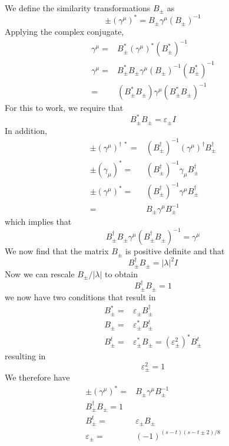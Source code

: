 \begin{defi}
We define the similarity transformations $B_{\pm}$ as
\[\pm (\gamma ^{\mu })^{\ast}=B_{\pm}\gamma ^{\mu }(B_{\pm})^{-1}\]
Applying the complex conjugate,
\begin{align*}
\gamma ^{\mu }=&B_{\pm}^{*}(\gamma ^{\mu })^{*}(B_{\pm}^{*})^{-1}\\
\gamma ^{\mu }=&B_{\pm}^{*}B_{\pm}\gamma ^{\mu }(B_{\pm})^{-1}(B_{\pm}^{*})^{-1}\\
=&(B^{*}_{\pm}B_{\pm})\gamma ^{\mu }(B^{*}_{\pm}B_{\pm})^{-1}
\end{align*}
For this to work, we require that
\[B^{*}_{\pm}B_{\pm}=\varepsilon _{\pm}I\]
In addition,
\begin{align*}
\pm(\gamma ^{\mu })^{\dagger\;\ast}=&(B_{\pm}^{\dagger})^{-1}(\gamma ^{\mu })^{\dagger}B_{\pm}^{\dagger}\\
\pm( \gamma _{\mu })^{\ast}=&(B_{\pm}^{\dagger})^{-1}\gamma _{\mu }B_{\pm}^{\dagger}\\
\pm(\gamma ^{\mu })^{\ast}=&(B^{\dagger}_{\pm})^{-1}\gamma ^{\mu }B_{\pm}^{\dagger}\\
=&B_{\pm}\gamma ^{\mu }B_{\pm}^{-1}
\end{align*}
which implies that
\[B^{\dagger}_{\pm}B_{\pm}\gamma ^{\mu }(B^{\dagger}_{\pm}B_{\pm})^{-1}=\gamma ^{\mu }\]
We now find that the matrix $B_{\pm}$ is positive definite and that
\[B^{\dagger}_{\pm}B_{\pm}=|\lambda |^{2}I\]
Now we can rescale $B_{\pm}/|\lambda |$ to obtain
\[B^{\dagger}_{\pm}B_{\pm}=1\]
we now have two conditions that result in 
\begin{align*}
B_{\pm}^{*}=&\varepsilon _{\pm}B_{\pm}^{\dagger}\\
B_{\pm}=&\varepsilon _{\pm}^{*}B^{t}_{\pm}\\
B_{\pm}^{t}=&\varepsilon _{\pm}^{*}B_{\pm}=(\varepsilon _{\pm}^2)^{*}B_{\pm}^{t}
\end{align*}
resulting in
\[\varepsilon _{\pm}^2=1\]
We therefore have
\begin{align*}
\pm(\gamma ^{\mu })^{*}=&B_{\pm}\gamma ^{\mu }B_{\pm}^{-1}\\
B_{\pm}^{\dagger}B_{\pm}=1\\
B_{\pm}^{t}=&\varepsilon _{\pm}B_{\pm}\\
\varepsilon _{\pm}=&(-1)^{(s-t)(s-t\pm 2)/8}
\end{align*}
\end{defi}
\vspace{2ex}
